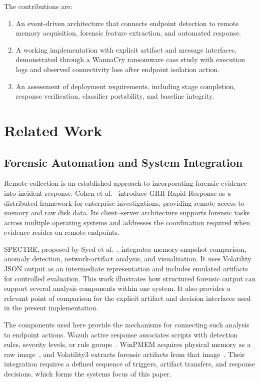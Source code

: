 \documentclass[conference]{IEEEtran}
\begin{document}
The contributions are:
\begin{enumerate}
\item An event-driven architecture that connects endpoint detection to remote memory acquisition, forensic feature extraction, and automated response. 
\item A working implementation with explicit artifact and message interfaces, demonstrated through a WannaCry ransomware case study with execution logs and observed connectivity loss after endpoint isolation action.
\item An assessment of deployment requirements, including stage completion, response verification, classifier portability, and baseline integrity.
\end{enumerate}

\section{Related Work}

\subsection{Forensic Automation and System Integration}
Remote collection is an established approach to incorporating forensic
evidence into incident response. Cohen et al.~\cite{cohen2011} introduce
GRR Rapid Response as a distributed framework for enterprise investigations,
providing remote access to memory and raw disk data. Its client--server
architecture supports forensic tasks across multiple operating systems and
addresses the coordination required when evidence resides on remote endpoints.

SPECTRE, proposed by Syed et al.~\cite{syed2026}, integrates memory-snapshot
comparison, anomaly detection, network-artifact analysis, and visualization.
It uses Volatility JSON output as an intermediate representation and includes
emulated artifacts for controlled evaluation. This work illustrates how
structured forensic output can support several analysis components within
one system. It also provides a relevant point of comparison for the explicit
artifact and decision interfaces used in the present implementation.

The components used here provide the mechanisms for connecting such analysis
to endpoint actions. Wazuh active response associates scripts with detection
rules, severity levels, or rule groups~\cite{wazuh}. WinPMEM acquires physical
memory as a raw image~\cite{winpmem}, and Volatility3 extracts forensic
artifacts from that image~\cite{volatility}. Their integration requires a
defined sequence of triggers, artifact transfers, and response decisions,
which forms the systems focus of this paper.
\end{document}
